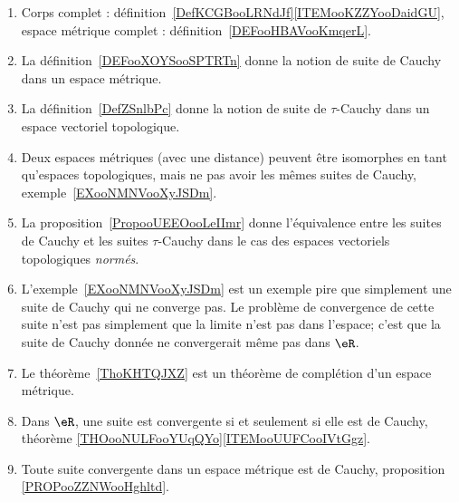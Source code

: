 \begin{enumerate}
    \item
        Corps complet : définition~\ref{DefKCGBooLRNdJf}\ref{ITEMooKZZYooDaidGU}, espace métrique complet : définition~\ref{DEFooHBAVooKmqerL}.
    \item
        La définition~\ref{DEFooXOYSooSPTRTn} donne la notion de suite de Cauchy dans un espace métrique.
    \item
        La définition~\ref{DefZSnlbPc} donne la notion de suite de \( \tau\)-Cauchy dans un espace vectoriel topologique.
    \item
        Deux espaces métriques (avec une distance) peuvent être isomorphes en tant qu'espaces topologiques, mais ne pas avoir les mêmes suites de Cauchy, exemple~\ref{EXooNMNVooXyJSDm}.
    \item
        La proposition~\ref{PropooUEEOooLeIImr} donne l'équivalence entre les suites de Cauchy et les suites \( \tau\)-Cauchy dans le cas des espaces vectoriels topologiques \emph{normés}.
    \item
        L'exemple~\ref{EXooNMNVooXyJSDm} est un exemple pire que simplement une suite de Cauchy qui ne converge pas. Le problème de convergence de cette suite n'est pas simplement que la limite n'est pas dans l'espace; c'est que la suite de Cauchy donnée ne convergerait même pas dans \( \eR\).
    \item
        Le théorème~\ref{ThoKHTQJXZ} est un théorème de complétion d'un espace métrique.
    \item
        Dans \( \eR\), une suite est convergente si et seulement si elle est de Cauchy, théorème \ref{THOooNULFooYUqQYo}\ref{ITEMooUUFCooIVtGgz}.
    \item
        Toute suite convergente dans un espace métrique est de Cauchy, proposition \ref{PROPooZZNWooHghltd}.
\end{enumerate}

